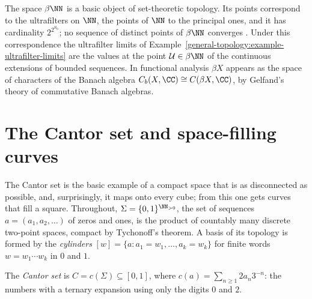 \begin{remark}\label{general-topology:remark-beta-n}
The space $\beta\NN$ is a basic object of set-theoretic topology. Its points correspond to the ultrafilters on $\NN$, the points of $\NN$ to the principal ones, and it has cardinality $2^{2^{\aleph_0}}$; no
sequence of distinct points of $\beta\NN$ converges \cite{engelking-general-topology}. Under this correspondence the ultrafilter limits of Example~\ref{general-topology:example-ultrafilter-limits} are the
values at the point $\mathcal{U} \in \beta\NN$ of the continuous extensions of bounded sequences. In functional analysis $\beta X$ appears as the space of characters of the Banach algebra
$C_b(X, \CC) \cong C(\beta X, \CC)$, by Gelfand's theory of commutative Banach algebras.
\end{remark}

\section{The Cantor set and space-filling curves}\label{general-topology:section-cantor}

The Cantor set is the basic example of a compact space that is as disconnected as possible, and, surprisingly, it maps onto every cube; from this one gets curves that fill a square. Throughout,
$\Sigma = \{0, 1\}^{\NN_{>0}}$, the set of sequences $a = (a_1, a_2, \ldots)$ of zeros and ones, is the product of countably many discrete two-point spaces, compact by Tychonoff's theorem. A basis of its
topology is formed by the \emph{cylinders} $[w] = \{a : a_1 = w_1, \ldots, a_k = w_k\}$ for finite words $w = w_1 \cdots w_k$ in $0$ and $1$.

\begin{definition}\label{general-topology:definition-cantor-set}
The \emph{Cantor set} is $C = c(\Sigma) \subseteq [0, 1]$, where $c(a) = \sum_{n \geq 1}2a_n3^{-n}$: the numbers with a ternary expansion using only the digits $0$ and $2$.
\end{definition}

